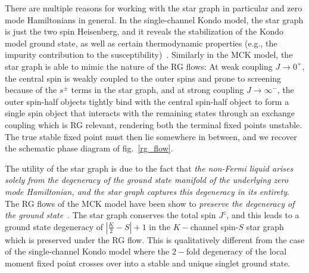 \documentclass[reprint,prb,superscriptaddress]{revtex4-2}
\begin{document}
There are multiple reasons for working with the star graph in particular and zero mode Hamiltonians in general. In the single-channel Kondo model, the star graph is just the two spin Heisenberg, and it reveals the stabilization of the Kondo model ground state, as well as certain thermodynamic properties (e.g., the impurity contribution to the susceptibility)~\cite{varma_yafet_1976,yosida_1966,wilson1975renormalization,moca_zarand_2021,varma_yafet_1976,kondo_urg}. Similarly in the MCK model, the star graph is able to mimic the nature of the RG flows: At weak coupling \(J \to 0^+\), the central spin is weakly coupled to the outer spins and  prone to screening because of the \(s^\pm\) terms in the star graph, and at strong coupling \(J \to \infty^-\), the outer spin-half objects tightly bind with the central spin-half object to form a single spin object that interacts with the remaining states through an exchange coupling which is RG relevant, rendering both the terminal fixed points unstable. The true stable fixed point must then lie somewhere in between, and we recover the schematic phase diagram of fig.~\ref{rg_flow}. 

The utility of the star graph is due to the fact that \textit{the non-Fermi liquid arises solely from the degeneracy of the ground state manifold of the underlying zero mode Hamiltonian, and the star graph captures this degeneracy in its entirety}. The RG flows of the MCK model have been show to \textit{preserve the degeneracy of the ground state}~\cite{pang_cox_1991,kroha_kolf_2007,zitko_fabrizio_2017}\textcolor{red}. The star graph conserves the total spin \(J^z\), and this leads to a ground state degeneracy of \(|\frac{K}{2}-S|+1\) in the \(K-\)channel spin-\(S\) star graph which is preserved under the RG flow. This is qualitatively different from the case of the single-channel Kondo model where the \(2-\)fold degeneracy of the local moment fixed point crosses over into a stable and unique singlet ground state. 
\end{document}
